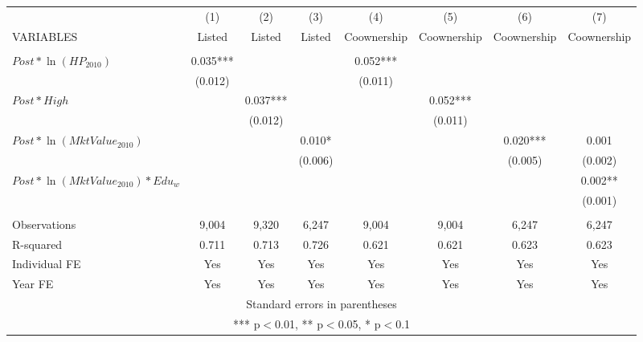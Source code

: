 \begin{tabular}{lccccccc} \hline
    & (1) & (2) & (3) & (4) & (5) & (6) & (7) \\
   VARIABLES & Listed & Listed & Listed & Coownership & Coownership & Coownership & Coownership \\ \hline
    &  &  &  &  &  & & \\
   $Post* \ln(HP_{2010})$ & 0.035*** &  &  & 0.052*** &  & &  \\
    & (0.012) &  &  & (0.011) &  & & \\
   $Post* High$ &  & 0.037*** &  &  & 0.052*** & & \\
    &  & (0.012) &  &  & (0.011) &  \\
   $Post* \ln(MktValue_{2010})$ &  &  & 0.010* &  &  & 0.020*** & 0.001\\
    &  &  & (0.006) &  &  & (0.005) & (0.002)\\
    $Post* \ln(MktValue_{2010})* Edu_w$ & & & & & & & 0.002**\\
    &  &  &  &  &  &  & (0.001)\\
        &  &  &  &  &  &  & \\
   Observations & 9,004 & 9,320 & 6,247 & 9,004 & 9,004 & 6,247 & 6,247\\
   R-squared & 0.711 & 0.713 & 0.726 & 0.621 & 0.621 & 0.623 & 0.623\\
   Individual FE & Yes & Yes & Yes & Yes & Yes & Yes & Yes \\
    Year FE & Yes & Yes & Yes & Yes & Yes & Yes  & Yes\\ \hline
   \multicolumn{8}{c}{ Standard errors in parentheses} \\
   \multicolumn{8}{c}{ *** p$<$0.01, ** p$<$0.05, * p$<$0.1} \\
   \end{tabular}
   
